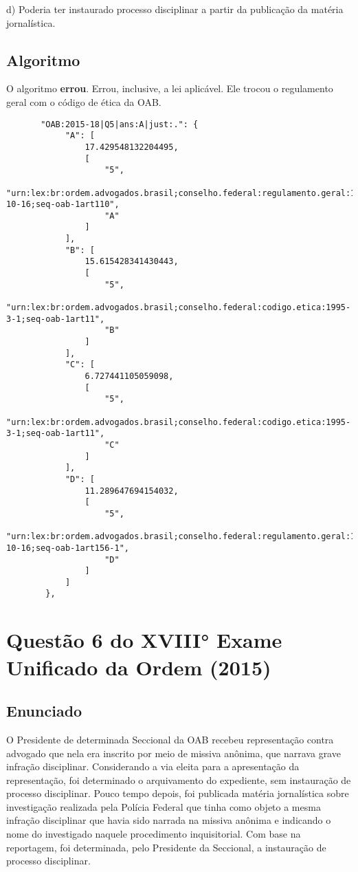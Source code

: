 \documentclass[12pt]{article}
\begin{document}
d) Poderia ter instaurado processo disciplinar a partir da publicação da matéria
jornalística.

\subsection{Algoritmo}

O algoritmo \textbf{errou}. Errou, inclusive, a lei aplicável. Ele trocou o regulamento geral com o código de ética da OAB.

\begin{lstlisting}
       "OAB:2015-18|Q5|ans:A|just:.": {
            "A": [
                17.429548132204495,
                [
                    "5",
                    "urn:lex:br:ordem.advogados.brasil;conselho.federal:regulamento.geral:1994-10-16;seq-oab-1art110",
                    "A"
                ]
            ],
            "B": [
                15.615428341430443,
                [
                    "5",
                    "urn:lex:br:ordem.advogados.brasil;conselho.federal:codigo.etica:1995-3-1;seq-oab-1art11",
                    "B"
                ]
            ],
            "C": [
                6.727441105059098,
                [
                    "5",
                    "urn:lex:br:ordem.advogados.brasil;conselho.federal:codigo.etica:1995-3-1;seq-oab-1art11",
                    "C"
                ]
            ],
            "D": [
                11.289647694154032,
                [
                    "5",
                    "urn:lex:br:ordem.advogados.brasil;conselho.federal:regulamento.geral:1994-10-16;seq-oab-1art156-1",
                    "D"
                ]
            ]
        },

\end{lstlisting}


\section{Questão 6 do XVIII° Exame Unificado da Ordem (2015)}

\subsection{Enunciado}

O Presidente de determinada Seccional da OAB recebeu 
representação contra advogado que nela era inscrito por meio 
de missiva anônima, que narrava grave infração disciplinar. 
Considerando a via eleita para a apresentação da representação, foi determinado o arquivamento do expediente, sem instauração de processo disciplinar. Pouco tempo depois, foi publicada matéria jornalística sobre investigação realizada pela Polícia Federal que tinha como objeto a mesma infração disciplinar que havia sido narrada na  missiva anônima e indicando o nome do investigado naquele procedimento inquisitorial. Com base na reportagem, foi determinada, pelo Presidente da Seccional, a instauração de processo disciplinar. 
 
\end{document}
